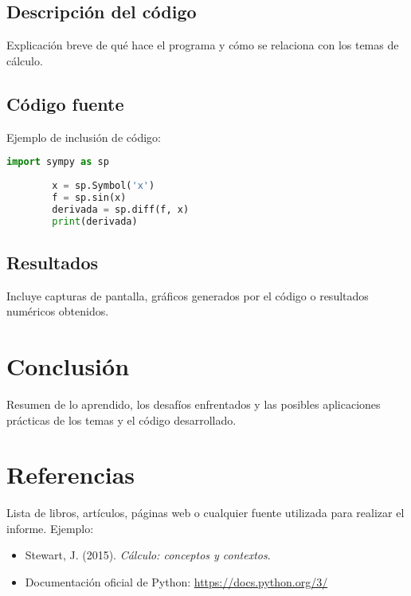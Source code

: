 \documentclass[12pt]{article}
\begin{document}
	\subsection{Descripción del código}
	Explicación breve de qué hace el programa y cómo se relaciona con los temas de cálculo.
	
	\subsection{Código fuente}
	Ejemplo de inclusión de código:
	\begin{lstlisting}[language=Python, caption={Cálculo de derivadas con Python}]
		import sympy as sp
		
		x = sp.Symbol('x')
		f = sp.sin(x)
		derivada = sp.diff(f, x)
		print(derivada)
	\end{lstlisting}
	
	\subsection{Resultados}
	Incluye capturas de pantalla, gráficos generados por el código o resultados numéricos obtenidos.
	
	\section{Conclusión}
	Resumen de lo aprendido, los desafíos enfrentados y las posibles aplicaciones prácticas de los temas y el código desarrollado.
	
	\section{Referencias}
	Lista de libros, artículos, páginas web o cualquier fuente utilizada para realizar el informe. Ejemplo:
	\begin{itemize}
		\item Stewart, J. (2015). \textit{Cálculo: conceptos y contextos}.
		\item Documentación oficial de Python: \url{https://docs.python.org/3/}
	\end{itemize}
	
\end{document}
